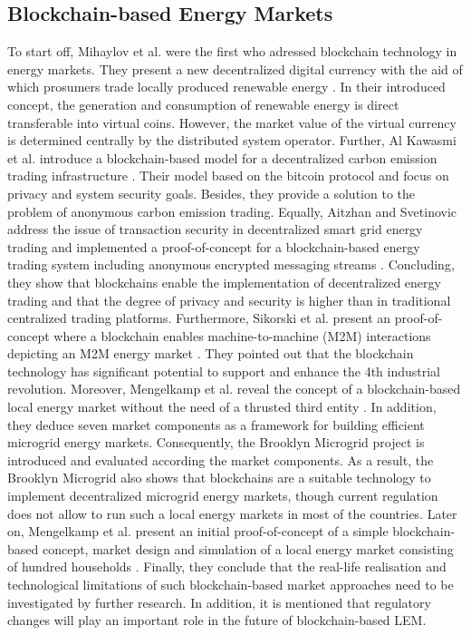 \subsection{Blockchain-based Energy Markets}
\label{sec:Blockchain-based Energy Markets}
To start off, Mihaylov et al. were the first who adressed blockchain technology in energy markets. They present a new decentralized digital currency with the aid of which prosumers trade locally produced renewable energy \cite{mihaylov2014nrgcoin}. In their introduced concept, the generation and consumption of renewable energy is direct transferable into virtual coins. However, the market value of the virtual currency is determined centrally by the distributed system operator. Further, Al Kawasmi et al. introduce a blockchain-based model for a decentralized carbon emission trading infrastructure \cite{al2015bitcoin}. Their model based on the bitcoin protocol  and focus on privacy and system security goals. Besides, they provide a solution to the problem of anonymous carbon emission trading. Equally, Aitzhan and Svetinovic address the issue of transaction security in decentralized smart grid energy trading and implemented a proof-of-concept for a blockchain-based energy trading system including anonymous encrypted messaging streams \cite{aitzhan2018security}. Concluding, they show that blockchains enable the implementation of decentralized energy trading and that the degree of privacy and security is higher than in traditional centralized trading platforms. Furthermore, Sikorski et al. present an proof-of-concept where a blockchain enables machine-to-machine (M2M) interactions depicting an M2M energy market \cite{sikorski2017blockchain}. They pointed out that the blockchain technology has significant potential to support and enhance the 4th industrial revolution. Moreover, Mengelkamp et al. reveal the concept of a blockchain-based local energy market without the need of a thrusted third entity \cite{mengelkamp2018designing}. In addition, they deduce seven market components as a framework for building efficient microgrid energy markets. Consequently, the Brooklyn Microgrid project is introduced and evaluated according the market components. As a result, the Brooklyn Microgrid also shows that blockchains are a suitable technology to implement decentralized microgrid energy markets, though current regulation does not allow to run such a local energy markets in most of the countries. Later on, Mengelkamp et al. present an initial proof-of-concept of a simple blockchain-based concept, market design and simulation of a local energy market consisting of hundred households \cite{mengelkamp2018blockchain}. Finally, they conclude that the real-life realisation and technological limitations of such blockchain-based market approaches need to be investigated by further research. In addition, it is mentioned that regulatory changes will play an important role in the future of blockchain-based LEM.

